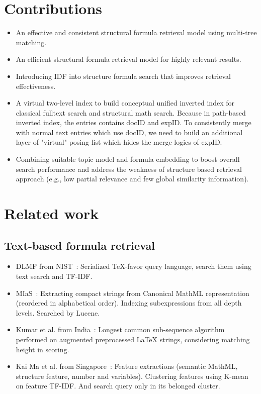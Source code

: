 \documentclass[11pt]{artikel3}
\begin{document}
\section{Contributions}
\begin{itemize}
\item An effective and consistent structural formula retrieval model using multi-tree matching.
\item An efficient structural formula retrieval model for highly relevant results.
\item Introducing IDF into structure formula search that improves retrieval effectiveness.
\item A virtual two-level index to build conceptual unified inverted index for classical fulltext search and structural math search. Because in path-based inverted index, the entries contains docID and expID. To consistently merge with normal text entries which use docID, we need to build an additional layer of "virtual" posing list which hides the merge logics of expID.
\item Combining suitable topic model and formula embedding to boost overall search performance and address the weakness of structure based retrieval approach (e.g., low partial relevance and few global similarity information).
\end{itemize}

\section{Related work}

\subsection{Text-based formula retrieval}
\begin{itemize}
\item DLMF from NIST~\cite{miller2003technical, youssef2005search}: Serialized TeX-favor query language, search them using text search and TF-IDF. 
\item MIaS~\cite{sojka2011indexing, sojka2011art}: Extracting compact strings from  Canonical MathML representation (reordered in alphabetical order). Indexing subexpressions from all depth levels. Searched by Lucene.
\item Kumar et al. from India~\cite{kumar2012structure}: Longest common sub-sequence algorithm performed on augmented preprocessed LaTeX strings, considering matching height in scoring.
\item Kai Ma et al. from Singapore~\cite{ma2010feature}: Feature extractions (semantic MathML, structure feature, number and variables). Clustering features using K-mean on feature TF-IDF. And search query only in its belonged cluster.
\end{itemize}
\end{document}
